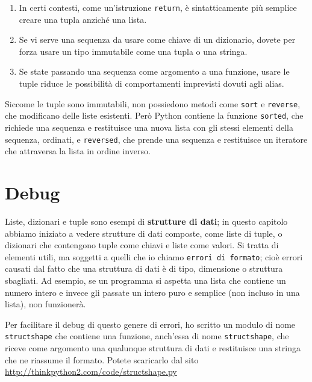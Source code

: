 \documentclass[10pt]{book}
\begin{document}
\begin{enumerate}

\item In certi contesti, come un'istruzione {\tt return}, è sintatticamente più semplice creare una tupla anziché una lista.

\item Se vi serve una sequenza da usare come chiave di un dizionario, dovete per forza usare un tipo immutabile come una tupla o una stringa.

\item Se state passando una sequenza come argomento a una funzione, usare le tuple riduce le possibilità di comportamenti imprevisti dovuti agli alias.

\end{enumerate}

Siccome le tuple sono immutabili, non possiedono metodi come {\tt sort} e {\tt reverse}, che modificano delle liste esistenti.
Però Python contiene la funzione {\tt sorted}, che richiede una sequenza e restituisce una nuova lista con gli stessi elementi della sequenza, ordinati, e {\tt reversed}, che prende una sequenza e restituisce un iteratore che attraversa la lista in ordine inverso.


\section{Debug}

Liste, dizionari e tuple sono esempi di {\bf strutture di dati}; in questo capitolo abbiamo iniziato a vedere strutture di dati composte, come liste di tuple, o dizionari che contengono tuple come chiavi e liste come valori. Si tratta di elementi utili, ma soggetti a quelli che io chiamo {\tt errori di formato}; cioè errori causati dal fatto che una struttura di dati è di tipo, dimensione o struttura sbagliati. Ad esempio, se un programma si aspetta una lista che contiene un numero intero e invece gli passate un intero puro e semplice (non incluso in una lista), non funzionerà.

Per facilitare il debug di questo genere di errori, ho scritto un modulo di nome {\tt structshape} che contiene una funzione, anch'essa di nome
{\tt structshape}, che riceve come argomento una qualunque struttura di dati e restituisce una stringa che ne riassume il formato. Potete scaricarlo dal sito \url{http://thinkpython2.com/code/structshape.py}
\end{document}
